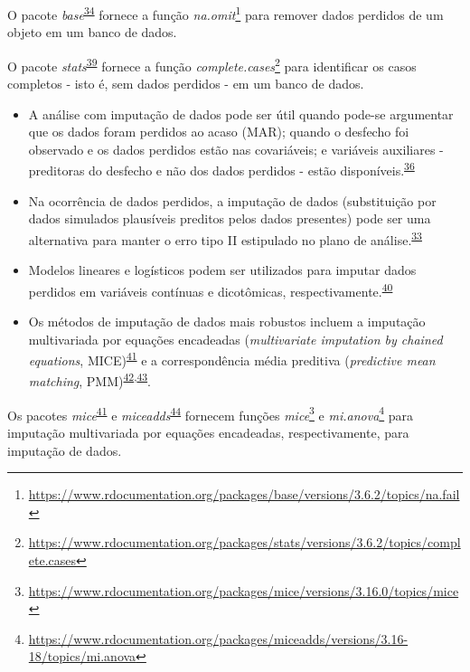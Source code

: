 \documentclass[
  a4paper,
]{book}
\renewcommand{\href}[2]{#2\footnote{\url{#1}}}
\newenvironment{infobox}[1]
  {
  \begin{itemize}
  \renewcommand{\labelitemi}{
    \raisebox{-.7\height}[0pt][0pt]{
      {\setkeys{Gin}{width=3em,keepaspectratio}
        \texttt{[image: \#1]}}
    }
  }
  \setlength{\fboxsep}{1em}
  \begin{blackbox}
  \item
  }
  {
  \end{blackbox}
  \end{itemize}
  }
\begin{document}
\begin{infobox}{images/Rlogo}
O pacote \emph{base}\textsuperscript{\protect\hyperlink{ref-base-2}{34}} fornece a função \href{https://www.rdocumentation.org/packages/base/versions/3.6.2/topics/na.fail}{\emph{na.omit}} para remover dados perdidos de um objeto em um banco de dados.

\end{infobox}

\begin{infobox}{images/Rlogo}
O pacote \emph{stats}\textsuperscript{\protect\hyperlink{ref-stats}{39}} fornece a função \href{https://www.rdocumentation.org/packages/stats/versions/3.6.2/topics/complete.cases}{\emph{complete.cases}} para identificar os casos completos - isto é, sem dados perdidos - em um banco de dados.

\end{infobox}

\begin{itemize}
\item
  A análise com imputação de dados pode ser útil quando pode-se argumentar que os dados foram perdidos ao acaso (MAR); quando o desfecho foi observado e os dados perdidos estão nas covariáveis; e variáveis auxiliares - preditoras do desfecho e não dos dados perdidos - estão disponíveis.\textsuperscript{\protect\hyperlink{ref-carpenter2021}{36}}
\item
  Na ocorrência de dados perdidos, a imputação de dados (substituição por dados simulados plausíveis preditos pelos dados presentes) pode ser uma alternativa para manter o erro tipo II estipulado no plano de análise.\textsuperscript{\protect\hyperlink{ref-Altman2007}{33}}
\item
  Modelos lineares e logísticos podem ser utilizados para imputar dados perdidos em variáveis contínuas e dicotômicas, respectivamente.\textsuperscript{\protect\hyperlink{ref-austin2023}{40}}
\item
  Os métodos de imputação de dados mais robustos incluem a imputação multivariada por equações encadeadas (\emph{multivariate imputation by chained equations}, MICE)\textsuperscript{\protect\hyperlink{ref-mice}{41}} e a correspondência média preditiva (\emph{predictive mean matching}, PMM)\textsuperscript{\protect\hyperlink{ref-rubin1986}{42},\protect\hyperlink{ref-little1988a}{43}}.
\end{itemize}

\begin{infobox}{images/Rlogo}
Os pacotes \emph{mice}\textsuperscript{\protect\hyperlink{ref-mice}{41}} e \emph{miceadds}\textsuperscript{\protect\hyperlink{ref-miceadds}{44}} fornecem funções \href{https://www.rdocumentation.org/packages/mice/versions/3.16.0/topics/mice}{\emph{mice}} e \href{https://www.rdocumentation.org/packages/miceadds/versions/3.16-18/topics/mi.anova}{\emph{mi.anova}} para imputação multivariada por equações encadeadas, respectivamente, para imputação de dados.

\end{infobox}
\end{document}
